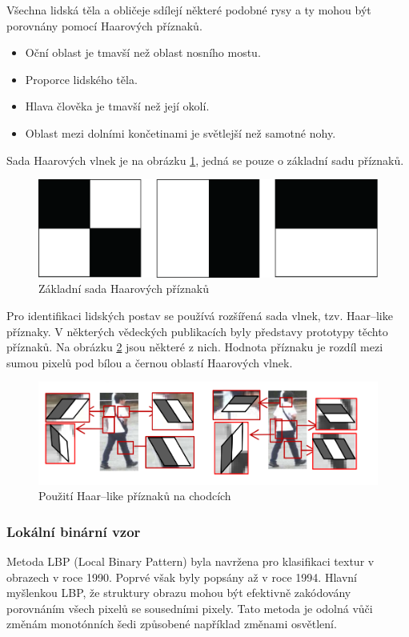Všechna lidská těla a obličeje sdílejí některé podobné rysy a ty mohou být porovnány pomocí Haarových příznaků.
\begin{itemize}
  \item{Oční oblast je tmavší než oblast nosního mostu.}
  \item{Proporce lidského těla.}
  \item{Hlava člověka je tmavší než její okolí.}
  \item{Oblast mezi dolními končetinami je světlejší než samotné nohy.}
\end{itemize}
Sada Haarových vlnek je na obrázku \ref{fig:basichaarfeatures}, jedná se pouze o základní sadu příznaků.
\begin{figure}[H]
\centering
\includegraphics[width=.7\linewidth]{figures/haar_features}
\caption{Základní sada Haarových příznaků}
\label{fig:basichaarfeatures}
\end{figure}

Pro identifikaci lidských postav se používá rozšířená sada vlnek, tzv. Haar--like příznaky. V některých vědeckých publikacích byly představy prototypy těchto příznaků. Na obrázku \ref{fig:haarlike} jsou některé z nich. Hodnota příznaku je rozdíl mezi sumou pixelů pod bílou a černou oblastí Haarových vlnek.
\begin{figure}[H]
\centering
\includegraphics[width=.8\linewidth]{figures/haar-like}
\caption{Použití Haar--like příznaků na chodcích \cite{haar:like}}
\label{fig:haarlike}
\end{figure}

\subsubsection*{Lokální binární vzor}
Metoda LBP (Local Binary Pattern) byla navržena pro klasifikaci textur v obrazech v roce 1990. \cite{lbp:texture} Poprvé však byly popsány až v roce 1994. \cite{lbp:first} Hlavní myšlenkou LBP, že struktury obrazu mohou být efektivně zakódovány porovnáním všech pixelů se sousedními pixely. Tato metoda je odolná vůči změnám monotónních šedi způsobené například změnami osvětlení.

